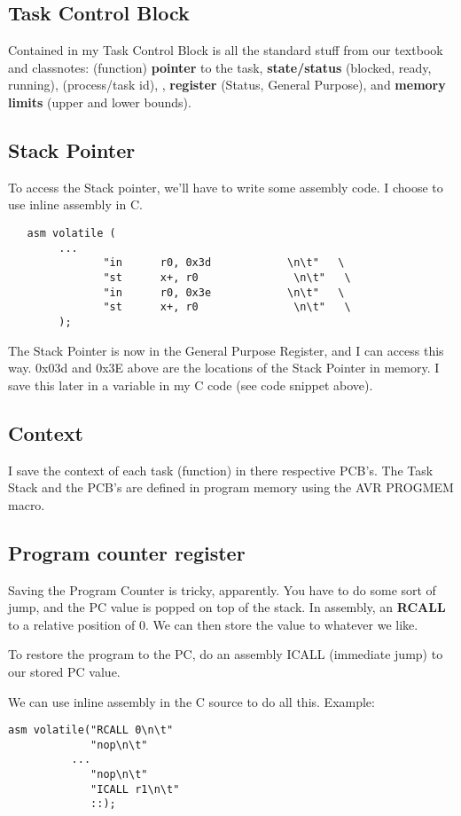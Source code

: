\documentclass[11pt,letterpaper]{article}
\begin{document}
\subsection{Task Control Block}
Contained in my Task Control Block is all the standard stuff from our textbook and classnotes: 
(function) \textbf{pointer} to the task, \textbf{state/status} (blocked, ready, running), 
 (process/task id), , \textbf{register} (Status, General Purpose), 
and \textbf{memory limits} (upper and lower bounds).


\subsection{Stack Pointer}
To access the Stack pointer, we'll have to write some assembly code. I choose to use inline assembly in C.

\begin{lstlisting}
   asm volatile ( 
		...
               "in      r0, 0x3d            \n\t"   \ 
               "st      x+, r0               \n\t"   \ 
               "in      r0, 0x3e            \n\t"   \ 
               "st      x+, r0               \n\t"   \
		);
\end{lstlisting}

The Stack Pointer is now in the General Purpose Register, and I can access this way. 0x03d and 0x3E above
are  the locations of the Stack Pointer in memory. I save this later in a variable in my C code (see code 
snippet above).

\subsection{Context}
I save the context of each task (function) in there respective PCB's. The Task Stack and the PCB's are
defined in program memory using the AVR PROGMEM macro.

\subsection{Program counter register}
Saving the Program Counter is tricky, apparently. You have to do some sort of jump, and the PC value is 
popped on top of the stack. In assembly, an \textbf{RCALL} to a relative position of 0. We can then store 
the value to whatever we like.

To restore the program to the PC, do an assembly ICALL (immediate jump) to our stored PC value.

We can use inline assembly in the C source to do all this. Example:
\begin{lstlisting}
asm volatile("RCALL 0\n\t"
             "nop\n\t"
	      ...
             "nop\n\t"
             "ICALL r1\n\t"
             ::);
\end{lstlisting}
\end{document}
